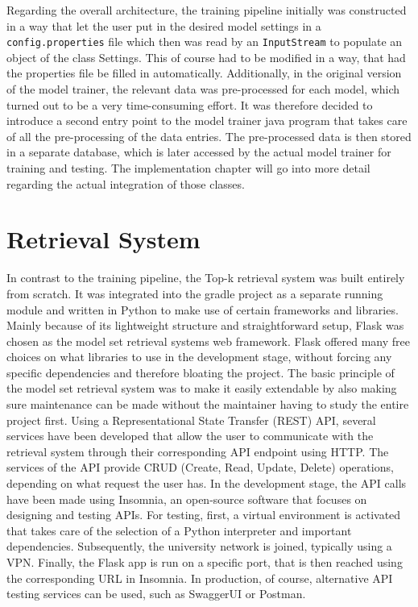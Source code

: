 Regarding the overall architecture, the training pipeline initially was constructed in a way that let the user put in the desired model settings in a \texttt{config.properties} file which then was read by an \texttt{InputStream} to populate an object of the class Settings. This of course had to be modified in a way, that had the properties file be filled in automatically. Additionally, in the original version of the model trainer, the relevant data was pre-processed for each model, which turned out to be a very time-consuming effort. It was therefore decided to introduce a second entry point to the model trainer java program that takes care of all the pre-processing of the data entries. The pre-processed data is then stored in a separate database, which is later accessed by the actual model trainer for training and testing. The implementation chapter will go into more detail regarding the actual integration of those classes.

\section{Retrieval System}

In contrast to the training pipeline, the Top-k retrieval system was built entirely from scratch. It was integrated into the gradle project as a separate running module and written in Python to make use of certain frameworks and libraries. Mainly because of its lightweight structure and straightforward setup, Flask was chosen as the model set retrieval systems web framework. Flask offered many free choices on what libraries to use in the development stage, without forcing any specific dependencies and therefore bloating the project. The basic principle of the model set retrieval system was to make it easily extendable by also making sure maintenance can be made without the maintainer having to study the entire project first. Using a Representational State Transfer (REST) API, several services have been developed that allow the user to communicate with the retrieval system through their corresponding API endpoint using HTTP. The services of the API provide CRUD (Create, Read, Update, Delete) operations, depending on what request the user has. In the development stage, the API calls have been made using Insomnia, an open-source software that focuses on designing and testing APIs. For testing, first, a virtual environment is activated that takes care of the selection of a Python interpreter and important dependencies. Subsequently, the university network is joined, typically using a VPN. Finally, the Flask app is run on a specific port, that is then reached using the corresponding URL in Insomnia. In production, of course, alternative API testing services can be used, such as SwaggerUI or Postman.

